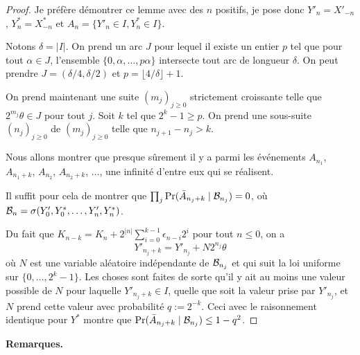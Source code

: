 \documentclass[12pt,a4paper]{article}
\begin{document}
\begin{proof}
Je préfère démontrer ce lemme avec des $n$ positifs, je pose donc 
$Y'_n = X'_{-n}$, $Y^*_n=X^*_{-n}$ et 
$A_n = \{Y'_n \in I, Y^*_n \in I\}$.

Notons $\delta = |I|$. 
On prend un arc $J$ pour lequel il existe un entier $p$ tel que 
pour tout $\alpha \in J$, l'ensemble $\{0, \alpha, \ldots, p\alpha\}$ 
intersecte tout arc de longueur $\delta$. 
On peut prendre $J = (\delta/4, \delta/2)$ et $p=\lfloor 4/\delta \rfloor +1$. 

On prend maintenant une suite ${(m_j)}_{j \geq 0}$ strictement croissante 
telle que $2^{m_j}\theta \in J$ pour tout $j$. 
Soit $k$ tel que $2^k-1 \geq p$. 
On prend une sous-suite ${(n_j)}_{j \geq 0}$ de ${(m_j)}_{j \geq 0}$ 
telle que $n_{j+1} - n_j > k$. 

Nous allons montrer que presque sûrement il y a parmi les événements $A_{n_1}$, $A_{n_1+k}$, $A_{n_2}$, 
$A_{n_2+k}$, $\ldots$, une infinité d'entre eux qui se réalisent. 

Il suffit pour cela de montrer que 
$\prod_j \Pr(\bar A_{n_j+k} \mid \mathcal{B}_{n_j}) = 0$, où 
$\mathcal{B}_n = \sigma(Y'_0, Y^*_0, \ldots, Y'_n, Y^*_n)$.   

Du fait que $K_{n-k} = K_n + 2^{|n|}\sum_{i=0}^{k-1}\epsilon_{n-i}2^i$ pour tout 
$n \leq 0$, on a 
$$
Y'_{n_j+k} = Y'_{n_j} + N 2^{n_j}\theta
$$
où $N$ est une variable aléatoire indépendante de $\mathcal{B}_{n_j}$ et qui suit la  
loi uniforme sur $\{0, \ldots, 2^k-1\}$. 
Les choses sont faites de sorte qu'il y ait au moins une valeur possible de $N$ 
pour laquelle $Y'_{n_j+k} \in I$, quelle que soit la valeur prise par 
$Y'_{n_j}$, et $N$ prend cette valeur avec probabilité $q:=2^{-k}$. 
Ceci avec le raisonnement identique pour $Y^*$ montre que 
$\Pr(\bar A_{n_j+k} \mid \mathcal{B}_{n_j}) \leq 1-q^2$. 
\end{proof}


\bigskip
\noindent
{\bf \large Remarques.}
\end{document}
